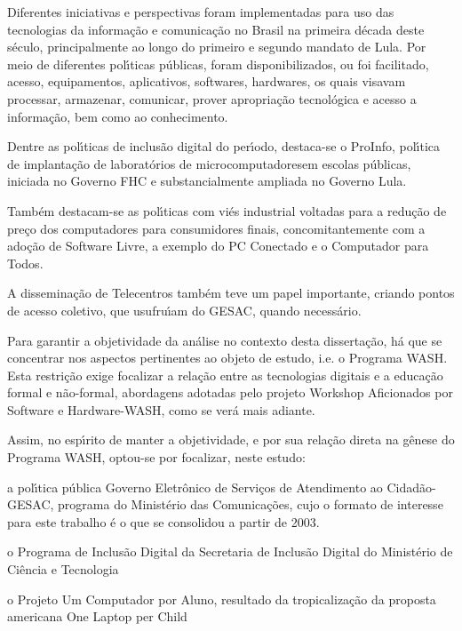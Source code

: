 \documentclass[
12pt,		%
openright,	%
twoside,  %
a4paper,			%
chapter=TITLE,		%
english,			%
french,				%
spanish,			%
brazil				%
]{USPSC-classe/USPSC}
\begin{document}
Diferentes iniciativas e perspectivas foram implementadas para uso das tecnologias da informa\c{c}\~ao e comunica\c{c}\~ao no Brasil na primeira d\'ecada deste s\'eculo, principalmente ao longo do primeiro e segundo mandato de Lula. Por meio de diferentes pol\'{\i}ticas p\'ublicas, foram disponibilizados, ou foi facilitado, acesso, equipamentos, aplicativos, softwares, hardwares, os quais visavam processar, armazenar, comunicar, prover apropria\c{c}\~ao tecnol\'ogica e acesso a  informa\c{c}\~ao, bem como ao conhecimento.




Dentre as pol\'{\i}ticas de inclus\~ao digital do per\'{\i}odo, destaca-se o ProInfo, pol\'{\i}tica de implanta\c{c}\~ao de \textquotedbl laborat\'orios de microcomputadores\textquotedbl  em escolas p\'ublicas, iniciada no Governo FHC e substancialmente ampliada no Governo Lula.




Tamb\'em destacam-se as pol\'{\i}ticas com vi\'es industrial voltadas para a redu\c{c}\~ao de pre\c{c}o dos computadores para consumidores finais, concomitantemente com a ado\c{c}\~ao de Software Livre, a exemplo do PC Conectado e o Computador para Todos.




A dissemina\c{c}\~ao de Telecentros tamb\'em teve um papel importante, criando pontos de acesso coletivo, que usufru\'{\i}am do GESAC, quando necess\'ario.




Para garantir a objetividade da an\'alise no contexto desta disserta\c{c}\~ao, h\'a que se concentrar nos aspectos pertinentes ao objeto de estudo, i.e. o Programa WASH. Esta restri\c{c}\~ao exige focalizar a rela\c{c}\~ao entre as tecnologias digitais e a educa\c{c}\~ao formal e n\~ao-formal, abordagens adotadas pelo projeto Workshop Aficionados por Software e Hardware-WASH, como se ver\'a mais adiante.




Assim, no esp\'{\i}rito de manter a objetividade, e por sua rela\c{c}\~ao direta na g\^enese do Programa WASH, optou-se por focalizar, neste estudo:





\begin{alineas}
\item a pol\'{\i}tica p\'ublica \textquotedbl Governo Eletr\^onico de Servi\c{c}os de Atendimento ao Cidad\~ao-GESAC\textquotedbl , programa do Minist\'erio das Comunica\c{c}\~oes, cujo o formato de interesse para este trabalho \'e o que se consolidou a partir de 2003.
\item o Programa de Inclus\~ao Digital da Secretaria de Inclus\~ao Digital do Minist\'erio de Ci\^encia e Tecnologia
\item o Projeto Um Computador por Aluno, resultado da tropicaliza\c{c}\~ao da proposta americana \textquotedbl One Laptop per Child\textquotedbl 
\end{alineas}
\end{document}
